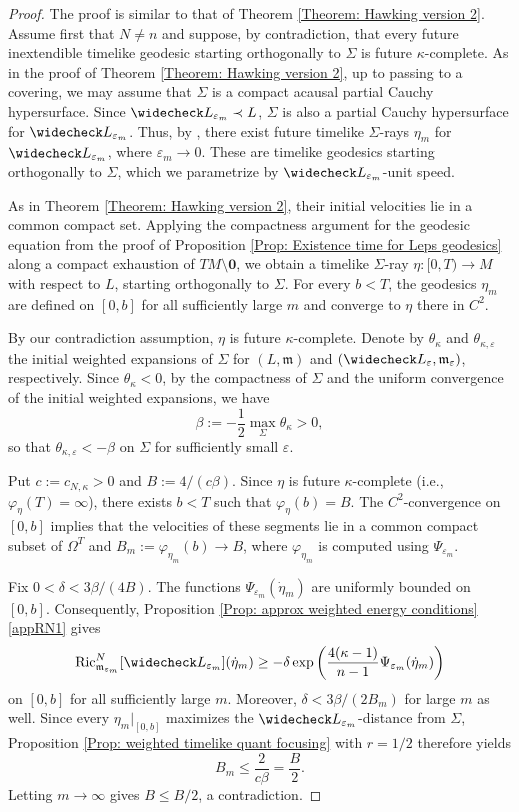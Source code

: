 \documentclass[a4paper,11pt]{article}
\numberwithin{equation}{section}
\theoremstyle{definition}
\theoremstyle{plain}
\newcommand{\eps}{\varepsilon}
\begin{document}
\begin{proof}
The proof is similar to that of Theorem \ref{Theorem: Hawking version 2}. 
Assume first that $N\ne n$ and suppose, by contradiction, that every future inextendible timelike geodesic starting orthogonally to $\Sigma$ is future $\kappa$-complete.
As in the proof of Theorem \ref{Theorem: Hawking version 2}, up to passing to a covering, we may assume that $\Sigma$ is a compact acausal partial Cauchy hypersurface. 
Since $\widecheck L_{\eps_m} \prec L$, $\Sigma$ is also a partial Cauchy hypersurface for $\widecheck L_{\eps_m}$.
Thus, by \cite[Thm.\ 8.11]{LuMinguzziOhtaSingularity}, there exist future timelike $\Sigma$-rays $\eta_m$ for $\widecheck L_{\varepsilon_m}$, where $\varepsilon_m \to 0$. 
These are timelike geodesics starting orthogonally to $\Sigma$, which we parametrize by $\widecheck L_{\varepsilon_m}$-unit speed.

As in Theorem \ref{Theorem: Hawking version 2}, their initial velocities lie in a common compact set. 
Applying the compactness argument for the geodesic equation from the proof of Proposition \ref{Prop: Existence time for Leps geodesics} along a compact exhaustion of $TM\setminus \mathbf 0$, we obtain a timelike $\Sigma$-ray $\eta:[0,T)\to M$ with respect to $L$, starting orthogonally to $\Sigma$.
For every $b<T$, the geodesics $\eta_m$ are defined on $[0,b]$ for all sufficiently large $m$ and converge to $\eta$ there in $C^2$.

By our contradiction assumption, $\eta$ is future $\kappa$-complete. 
Denote by $\theta_\kappa$ and $\theta_{\kappa,\varepsilon}$ the initial weighted expansions of $\Sigma$ for $(L,\mathfrak m)$ and $(\widecheck L_\varepsilon,\mathfrak m_\varepsilon)$, respectively.
Since $\theta_\kappa<0$, by the compactness of $\Sigma$ and the uniform convergence of the initial weighted expansions, we have
\[
    \beta:=-\frac12\max_\Sigma\theta_\kappa>0,
\]
so that $\theta_{\kappa,\eps}<-\beta$ on $\Sigma$ for sufficiently small $\eps$.

Put $c:=c_{N,\kappa}>0$ and $B:=4/(c\beta)$.
Since $\eta$ is future $\kappa$-complete (i.e., $\varphi_\eta(T)=\infty$), there exists $b<T$ such that $\varphi_\eta(b)=B$.
The $C^2$-convergence on $[0,b]$ implies that the velocities of
these segments lie in a common compact subset of $\Omega^T$ and $B_m:=\varphi_{\eta_m}(b)\to B$,
where $\varphi_{\eta_m}$ is computed using $\Psi_{\varepsilon_m}$.

Fix $0<\delta<3\beta/(4B)$. The functions
$\Psi_{\varepsilon_m}(\dot\eta_m)$ are uniformly bounded on $[0,b]$.
Consequently, Proposition \ref{Prop: approx weighted energy conditions}\ref{appRN1} gives
\[
    \operatorname{Ric}^{N}_{\mathfrak m_{\varepsilon_m}}
    [\widecheck L_{\varepsilon_m}](\dot\eta_m)
    \ge
    -\delta\exp\left(
        \frac{4(\kappa-1)}{n-1}
        \Psi_{\varepsilon_m}(\dot\eta_m)
    \right)
\]
on $[0,b]$ for all sufficiently large $m$.
Moreover,
$\delta<3\beta/(2B_m)$ for large $m$ as well.
Since every $\eta_m|_{[0,b]}$ maximizes the $\widecheck L_{\varepsilon_m}$-distance from $\Sigma$,
Proposition \ref{Prop: weighted timelike quant focusing} with $r=1/2$ therefore yields
\[
    B_m\le\frac{2}{c\beta}=\frac{B}{2}.
\]
Letting $m\to\infty$ gives $B\le B/2$, a contradiction.


\end{proof}
\end{document}
